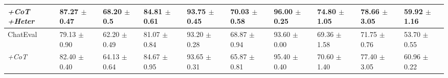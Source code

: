 \begin{table*}[tbp]
{\begin{tabular}{l|lllllllll}
\textit{+CoT +Heter} & \cellcolor{LightRed}87.27 $\pm$ 0.47 & \cellcolor{LightRed}68.20 $\pm$ 0.5 & \cellcolor{LightRed}84.81 $\pm$ 0.61 & \cellcolor{LightRed}93.75 $\pm$ 0.45 & \cellcolor{LightRed}70.03 $\pm$ 0.58 & \cellcolor{LightRed}96.00 $\pm$ 0.25 & \cellcolor{LightRed}74.80 $\pm$ 1.05 & \cellcolor{LightRed}78.66 $\pm$ 3.05  & \cellcolor{LightBlue} 59.92 $\pm$ 1.16 \\
\bottomrule
\hline
ChatEval & \cellcolor{LightBlue}79.13 $\pm$ 0.90 & \cellcolor{LightBlue}62.20 $\pm$ 0.49 & \cellcolor{LightBlue}81.07 $\pm$ 0.84 & \cellcolor{LightBlue}93.20 $\pm$ 0.28 & \cellcolor{LightRed}68.87 $\pm$ 0.94 & 93.60 $\pm$ 0.00 & \cellcolor{LightBlue}69.36 $\pm$ 1.58 & \cellcolor{LightBlue}71.75 $\pm$ 0.76 & \cellcolor{LightBlue}53.70 $\pm$ 0.55 \\
\textit{+CoT}& \cellcolor{LightRed}82.40 $\pm$ 0.40 &\cellcolor{LightRed}64.13 $\pm$ 0.64 & \cellcolor{LightRed}84.67 $\pm$ 0.95 & \cellcolor{LightRed}93.65 $\pm$ 0.31 & \cellcolor{LightBlue}65.87 $\pm$ 0.81 & \cellcolor{LightRed}95.40 $\pm$ 0.40 & \cellcolor{LightBlue}70.60 $\pm$ 1.40 & \cellcolor{LightBlue}77.40 $\pm$ 3.05 & \cellcolor{LightBlue}60.96 $\pm$ 0.22 \\
\bottomrule
\end{tabular}}
\end{table*}